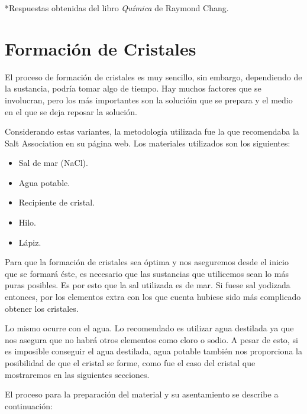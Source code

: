 \documentclass[letterpaper]{article}
\begin{document}
*Respuestas obtenidas del libro \textit{Química} de Raymond Chang.\supercite{chang13}
\section*{Formación de Cristales}
El proceso de formación de cristales es muy sencillo, sin embargo, dependiendo de la sustancia, podría tomar algo de tiempo. Hay muchos factores que se involucran, pero los más importantes son la solucióin que se prepara y el medio en el que se deja reposar la solución.

Considerando estas variantes, la metodología utilizada fue la que recomendaba la Salt Association en su página web. \supercite{sa19} Los materiales utilizados son los siguientes:

\begin{itemize}
	\item Sal de mar (NaCl).
	\item Agua potable.
	\item Recipiente de cristal.
	\item Hilo.
	\item Lápiz.
\end{itemize}

Para que la formación de cristales sea óptima y nos aseguremos desde el inicio que se formará éste, es necesario que las sustancias que utilicemos sean lo más puras posibles. Es por esto que la sal utilizada es de mar. Si fuese sal yodizada entonces, por los elementos extra con los que cuenta hubiese sido más complicado obtener los cristales.

Lo mismo ocurre con el agua. Lo recomendado es utilizar agua destilada ya que nos asegura que no habrá otros elementos como cloro o sodio. A pesar de esto, si es imposible conseguir el agua destilada, agua potable también nos proporciona la posibilidad de que el cristal se forme, como fue el caso del cristal que mostraremos en las siguientes secciones.

El proceso para la preparación del material y su asentamiento se describe a continuación:
\end{document}
